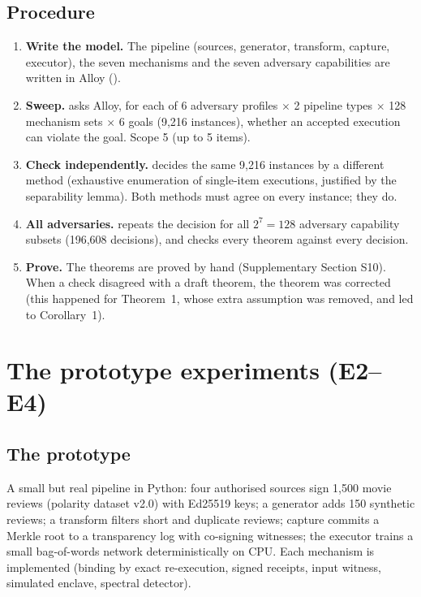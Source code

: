 \subsection*{Procedure}
\begin{enumerate}
\item \textbf{Write the model.} The pipeline (sources, generator, transform, capture,
  executor), the seven mechanisms and the seven adversary capabilities are written in Alloy
  ().
\item \textbf{Sweep.}  asks Alloy, for each of 6 adversary profiles
  $\times$ 2 pipeline types $\times$ 128 mechanism sets $\times$ 6 goals (9,216 instances), whether
  an accepted execution can violate the goal. Scope 5 (up to 5 items).
\item \textbf{Check independently.}  decides the same
  9,216 instances by a different method (exhaustive enumeration of single-item executions,
  justified by the separability lemma). Both methods must agree on every instance; they do.
\item \textbf{All adversaries.}  repeats the decision for all
  $2^7=128$ adversary capability subsets (196,608 decisions), and
   checks every theorem against every decision.
\item \textbf{Prove.} The theorems are proved by hand (Supplementary Section S10). When a
  check disagreed with a draft theorem, the theorem was corrected (this happened for
  Theorem~1, whose extra assumption was removed, and led to Corollary~1).
\end{enumerate}

\section{The prototype experiments (E2--E4)}
\subsection{The prototype}
A small but real pipeline in Python: four authorised sources sign 1,500 movie reviews
(polarity dataset v2.0) with Ed25519 keys; a generator adds 150 synthetic reviews; a
transform filters short and duplicate reviews; capture commits a Merkle root to a
transparency log with co-signing witnesses; the executor trains a small bag-of-words network
deterministically on CPU. Each mechanism is implemented (binding by exact re-execution, signed
receipts, input witness, simulated enclave, spectral detector).

